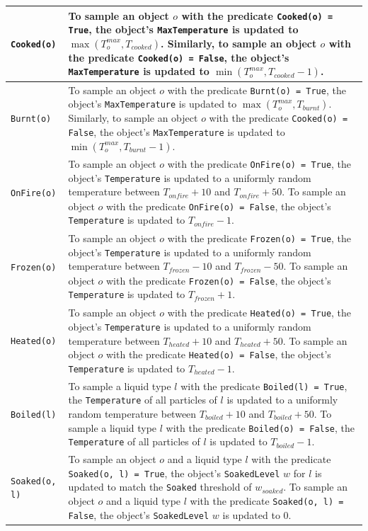 \begin{table}[!t]
\begin{center}
{\begin{tabular}{ | m{} | m{} | }
\hline
\texttt{Cooked(o)} & To sample an object $o$ with the predicate \texttt{Cooked(o) = True}, the object's \texttt{MaxTemperature} is updated to $\max(T_o^\mathit{max}, T_\mathit{cooked})$. Similarly, to sample an object $o$ with the predicate \texttt{Cooked(o) = False}, the object's \texttt{MaxTemperature} is updated to $\min(T_o^\mathit{max}, T_\mathit{cooked} - 1)$. \\
\hline
\texttt{Burnt(o)} & To sample an object $o$ with the predicate \texttt{Burnt(o) = True}, the object's \texttt{MaxTemperature} is updated to $\max(T_o^\mathit{max}, T_\mathit{burnt})$. Similarly, to sample an object $o$ with the predicate \texttt{Cooked(o) = False}, the object's \texttt{MaxTemperature} is updated to $\min(T_o^\mathit{max}, T_\mathit{burnt} - 1)$.\\
\hline
\texttt{OnFire(o)} & To sample an object $o$ with the predicate \texttt{OnFire(o) = True}, the object's \texttt{Temperature} is updated to a uniformly random temperature between $T_\mathit{onfire} + 10$ and $T_\mathit{onfire} + 50$. To sample an object $o$ with the predicate \texttt{OnFire(o) = False}, the object's \texttt{Temperature} is updated to $T_\mathit{onfire} - 1$. \\
\hline
\texttt{Frozen(o)} & To sample an object $o$ with the predicate \texttt{Frozen(o) = True}, the object's \texttt{Temperature} is updated to a uniformly random temperature between $T_\mathit{frozen} - 10$ and $T_\mathit{frozen} - 50$. To sample an object $o$ with the predicate \texttt{Frozen(o) = False}, the object's \texttt{Temperature} is updated to $T_\mathit{frozen} + 1$. \\
\hline
\texttt{Heated(o)} & To sample an object $o$ with the predicate \texttt{Heated(o) = True}, the object's \texttt{Temperature} is updated to a uniformly random temperature between $T_\mathit{heated} + 10$ and $T_\mathit{heated} + 50$. To sample an object $o$ with the predicate \texttt{Heated(o) = False}, the object's \texttt{Temperature} is updated to $T_\mathit{heated} - 1$. \\
\hline
\texttt{Boiled(l)} & To sample a liquid type $l$ with the predicate \texttt{Boiled(l) = True}, the \texttt{Temperature} of all particles of $l$ is updated to a uniformly random temperature between $T_\mathit{boiled} + 10$ and $T_\mathit{boiled} + 50$. To sample a liquid type $l$ with the predicate \texttt{Boiled(o) = False}, the \texttt{Temperature} of all particles of $l$ is updated to $T_\mathit{boiled} - 1$. \\
\hline
\texttt{Soaked(o, l)} & To sample an object $o$ and a liquid type $l$ with the predicate \texttt{Soaked(o, l) = True}, the object's \texttt{SoakedLevel} $w$ for $l$ is updated to match the \texttt{Soaked} threshold of $w_\mathit{soaked}$. To sample an object $o$ and a liquid type $l$ with the predicate \texttt{Soaked(o, l) = False}, the object's \texttt{SoakedLevel} $w$ is updated to 0.\\

\end{tabular}}
\end{center}
\end{table}
